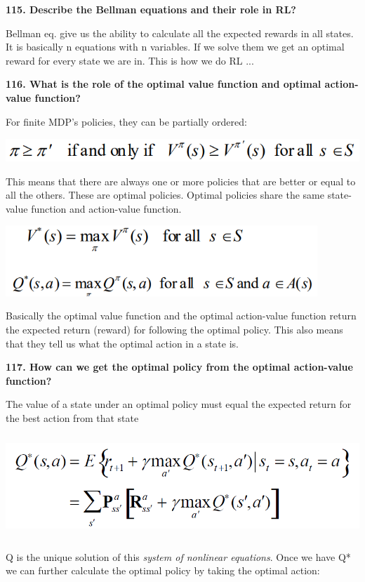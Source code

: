 \textbf{115. Describe the Bellman equations and their role in RL?}

Bellman eq. give us the ability to calculate all the expected rewards in
all states. It is basically n equations with n variables. If we solve
them we get an optimal reward for every state we are in. This is how we
do RL ...

\textbf{116. What is the role of the optimal value function and optimal
action-value function?}

For finite MDP's policies, they can be partially ordered:

\includegraphics[width=5.58355in,height=0.34317in]{media/image39.png}

This means that there are always one or more policies that are better or
equal to all the others. These are optimal policies. Optimal policies
share the same state-value function and action-value function.

\includegraphics[width=4.63021in,height=1.04603in]{media/image9.png}

Basically the optimal value function and the optimal action-value
function return the expected return (reward) for following the optimal
policy. This also means that they tell us what the optimal action in a
state is.

\textbf{117. How can we get the optimal policy from the optimal
action-value function?}

The value of a state under an optimal policy must equal the expected
return for the best action from that state

\includegraphics[width=6.26772in,height=1.51389in]{media/image31.png}

Q is the unique solution of this \emph{system of nonlinear equations}.
Once we have Q* we can further calculate the optimal policy by taking
the optimal action:

